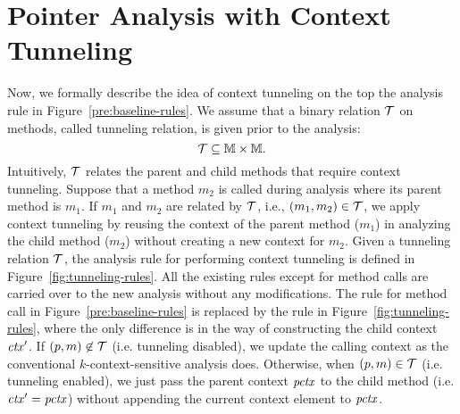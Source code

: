 \section{Pointer Analysis with Context Tunneling} \label{sec:tunneling}
Now, we formally describe the idea of context tunneling on the top the analysis rule in Figure~\ref{pre:baseline-rules}.
We assume that a binary relation $\mathcal{T}$ on methods,
called tunneling relation, is given prior to the analysis:
\[
  \mathcal{T} \subseteq {\mathbb{M}} \times {\mathbb{M}}.
\]
Intuitively, $\mathcal{T}$ relates the parent and child methods
that require context tunneling. Suppose that a method
$m_2$ is called during analysis where its parent method is $m_1$. If
$m_1$ and $m_2$ are related by $\mathcal{T}$, i.e., $(m_1,m_2) \in \mathcal{T}$, we apply context tunneling by
reusing the context of the parent method ($m_1$) in analyzing the
child method ($m_2$) without creating a new context for $m_2$.  Given
a tunneling relation $\mathcal{T}$, the analysis rule for
performing context tunneling is defined in
Figure~\ref{fig:tunneling-rules}. All the existing rules except for
method calls are carried over to the new analysis without any modifications.
The rule for method call in Figure~\ref{pre:baseline-rules} is
replaced by the rule in Figure~\ref{fig:tunneling-rules}, where the
only difference is in the way of constructing the child context
${\it ctx}'$. If $(p,m) \not\in \mathcal{T}$ (i.e. tunneling
disabled), we update the calling context as the conventional $k$-context-sensitive
analysis does. Otherwise, when $(p,m)\in \mathcal{T}$
(i.e. tunneling enabled), we just pass the parent context ${\it pctx}$ to
the child method (i.e. ${\it ctx}' = {\it pctx}$) without appending the current
context element to ${\it pctx}$.


